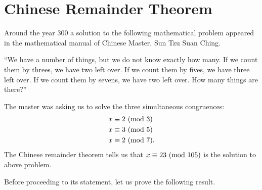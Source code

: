 \section{Chinese Remainder Theorem}
Around the year 300 a solution to the following mathematical problem appeared
in the mathematical manual of Chinese Master, Sun Tzu Suan Ching.

``We have a number of things, but we do not know exactly how many. If we count
them by threes, we have two left over. If we count them by fives, we have three
left over. If we count them by sevens, we have two left over. How many things are
there?''

The master was asking us to solve the three simultaneous congruences:
\begin{align*}
    x & \equiv 2\ (\mathrm{mod}\ 3)  \\
    x & \equiv 3\ (\mathrm{mod}\ 5)  \\
    x & \equiv 2\ (\mathrm{mod}\ 7).
\end{align*}
The Chinese remainder theorem tells us that $ x\equiv 23\ (\mathrm{mod}\ 105) $ is the solution to
above problem.

Before proceeding to its statement, let us prove the following result.

